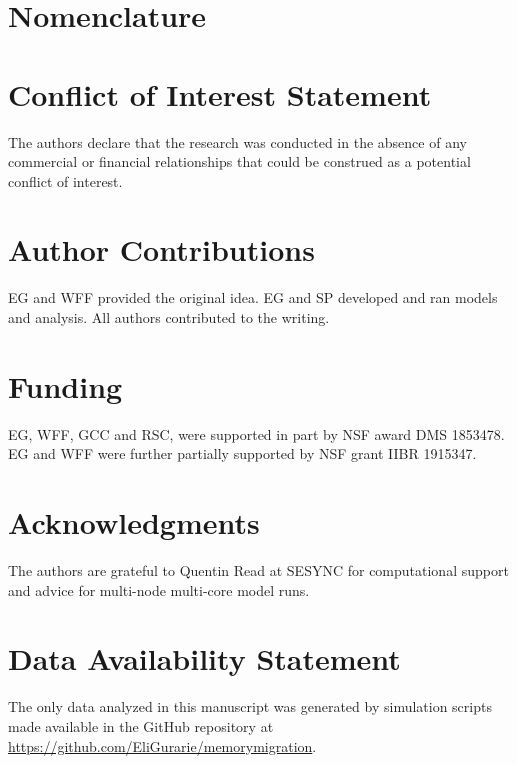 \documentclass[utf8]{frontiersSCNS} %
\begin{document}
\section{Nomenclature}


\section*{Conflict of Interest Statement}

The authors declare that the research was conducted in the absence of any commercial or financial relationships that could be construed as a potential conflict of interest.

\section*{Author Contributions}

EG and WFF provided the original idea. EG and SP developed and ran models and analysis. All authors contributed to the writing. 

\section*{Funding}

EG, WFF, GCC and RSC, were supported in part by NSF award DMS 1853478. EG and WFF were further partially supported by NSF grant IIBR 1915347. 

\section*{Acknowledgments}
The authors are grateful to Quentin Read at SESYNC for computational support and advice for multi-node multi-core model runs. 


\section*{Data Availability Statement}

The only data analyzed in this manuscript was generated by simulation scripts made available in the GitHub repository at \url{https://github.com/EliGurarie/memorymigration}. 


\end{document}
